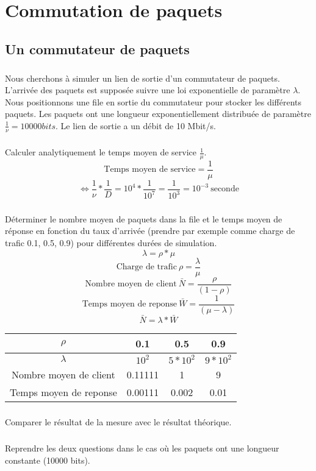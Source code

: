 
\chapter{Commutation de paquets}

    \section{Un commutateur de paquets}

        \paragraph{}
        Nous cherchons à simuler un lien de sortie d'un commutateur de paquets.
        L'arrivée des paquets est supposée suivre une loi exponentielle de paramètre $\lambda$.
        Nous positionnons une file en sortie du commutateur pour stocker les différents paquets.
        Les paquets ont une longueur exponentiellement distribuée de paramètre $\frac{1}{\nu} = 10 000 bits$.
        Le lien de sortie a un débit de 10 Mbit/s.

        \paragraph{}
        Calculer analytiquement le temps moyen de service $\frac{1}{\mu}$.
\[  \text{Temps moyen de service} = \frac{1}{\mu} \]
\[ \iff \frac{1}{\nu} * \frac{1}{D} = 10^{4} * \frac{1}{10^{7}} = \frac{1}{10^{3}} = 10^{-3} \ \text{seconde} \]

        \paragraph{}
        Déterminer le nombre moyen de paquets dans la file et le temps moyen de réponse en fonction du taux d'arrivée (prendre par exemple comme charge de trafic 0.1, 0.5, 0.9) pour différentes durées de simulation.
\[  \lambda = \rho * \mu \]
\[  \text{Charge de trafic} \ \rho = \frac{\lambda}{\mu} \]
\[  \text{Nombre moyen de client} \ \bar{N} = \frac{\rho}{(1 - \rho)} \]
\[  \text{Temps moyen de reponse} \ \bar{W} = \frac{1}{(\mu - \lambda)} \]
\[  \bar{N} = \lambda * \bar{W} \]

\begin{tabular}{ | c | c| c | c | }
\hline
    $\rho$ & 0.1 & 0.5 & 0.9 \\
\hline
    $\lambda$ & $10^{2}$ & $5*10^{2}$ & $9*10^{2}$ \\
\hline
    Nombre moyen de client & 0.11111 & 1 & 9 \\
\hline
    Temps moyen de reponse & 0.00111 & 0.002 & 0.01 \\
\hline
\end{tabular}

        \paragraph{}
        Comparer le résultat de la mesure avec le résultat théorique.

        \paragraph{}
        Reprendre les deux questions dans le cas où les paquets ont une longueur constante (10000 bits).


    \clearpage
